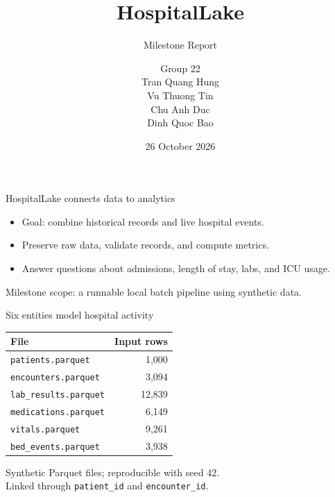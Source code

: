 \documentclass{beamer}
\title{HospitalLake}
\subtitle{Milestone Report}
\author[Group 22]{\texorpdfstring{Group 22\\Tran Quang Hung\\Vu Thuong Tin\\Chu Anh Duc\\Dinh Quoc Bao}{Group 22: Tran Quang Hung, Vu Thuong Tin, Chu Anh Duc, Dinh Quoc Bao}}
\institute{Big Data Project}
\date{26 October 2026}
\begin{document}
\begin{frame}
  \titlepage
\end{frame}

\begin{frame}{HospitalLake connects data to analytics}
  \begin{itemize}
    \item Goal: combine historical records and live hospital events.
    \item Preserve raw data, validate records, and compute metrics.
    \item Answer questions about admissions, length of stay, labs, and ICU usage.
  \end{itemize}
  \bigskip
  Milestone scope: a runnable local batch pipeline using synthetic data.
\end{frame}

\begin{frame}{Six entities model hospital activity}
  \begin{center}
    \begin{tabular}{lr}
      \toprule
      \textbf{File} & \textbf{Input rows} \\
      \midrule
      \texttt{patients.parquet} & 1,000 \\
      \texttt{encounters.parquet} & 3,094 \\
      \texttt{lab\_results.parquet} & 12,839 \\
      \texttt{medications.parquet} & 6,149 \\
      \texttt{vitals.parquet} & 9,261 \\
      \texttt{bed\_events.parquet} & 3,938 \\
      \bottomrule
    \end{tabular}
  \end{center}
  \smallskip
  Synthetic Parquet files; reproducible with seed 42.\\
  Linked through \texttt{patient\_id} and \texttt{encounter\_id}.
\end{frame}
\end{document}
